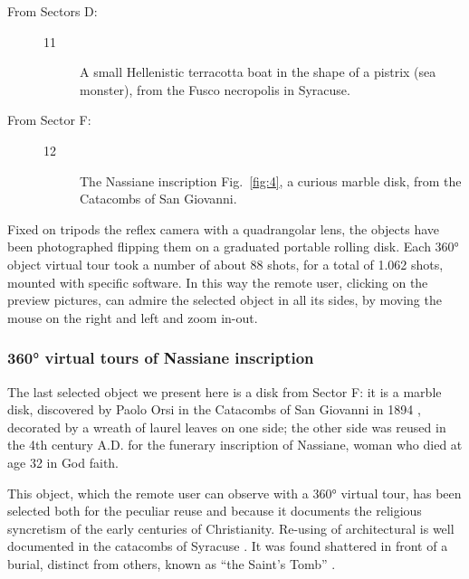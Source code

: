 \documentclass[amsthm,ebook]{saparticle}
\begin{document}
\begin{description}
\item[From Sectors D:]

\begin{description}
\item[11] A small Hellenistic terracotta boat in the shape of a pistrix (sea monster), from the Fusco necropolis in Syracuse. 

\end{description}

\item[From Sector F:]

\begin{description}
\item[12] The Nassiane inscription Fig.~\ref{fig:4}, a curious marble disk, from the Catacombs of San Giovanni.
\end{description}


\end{description}

Fixed on tripods the reflex camera with a quadrangolar lens, the objects have been photographed flipping them on a
graduated portable rolling disk. Each 360° object virtual tour took a number of about 88 shots, for a total of 1.062
shots, mounted with specific software. In this way the remote user, clicking on the preview pictures, can admire the
selected object in all its sides, by moving the mouse on the right and left and zoom in-out.




\subsubsection{360° virtual tours of Nassiane inscription}


\noindent The last selected object we present here is a disk from Sector F: it is a marble disk, discovered by Paolo Orsi in the
Catacombs of San Giovanni in 1894 \citep[509-510]{Orsi1895}, decorated by a wreath of laurel leaves on one side; the other
side was reused in the 4th century A.D. for the funerary inscription of Nassiane, woman who died at age 32 in God
faith. 

This object, which the remote user can observe with a 360° virtual tour, has been selected both for the peculiar reuse
and because it documents the religious syncretism of the early centuries of Christianity. Re-using of architectural is
well documented in the catacombs of Syracuse \citep{Sgarlata2013}. It was found shattered in front of a burial, distinct
from others, known as ``the Saint's Tomb'' \citep[40-44]{Sgarlata2004}. 
\end{document}
